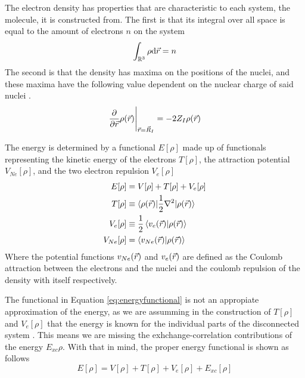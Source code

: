\documentclass[../master_thesis.tex]{subfiles}
\begin{document}
The electron density has properties that are characteristic to each system, the
molecule,  it is constructed from. The first is that its integral over all space
is equal to the amount of electrons $n$ on the system \cite{Cramer:2004}
\begin{equation}
  \int_{\mathbb{R}^3}\rho \text{d}\vec{r} = n
\end{equation}
The second is that the density has maxima on the positions of the nuclei, and
these maxima have the following value dependent on the nuclear charge of said
nuclei \cite{Cramer:2004}.
\begin{equation}
 \frac{\partial}{\partial \vec{r}}\rho(\vec{r})\Bigg|_{\vec{r} = \vec{R}_I} = -2Z_I\rho(\vec{r})
\end{equation}

The energy is determined by a functional $E[\rho]$ made up of functionals representing
the kinetic energy of the electrons $T[\rho]$, the attraction potential $V_{Ne}[\rho]$,
and the two electron repulsion $V_{e}[\rho]$ \cite{Sorland, PhysRev.136.B864}
\begin{align}
  E[\rho] &= V[\rho] + T[\rho] + V_{e}[\rho]\\\label{eq:energyfunctional}
  T[\rho] &\equiv\braket{\rho(\vec{r})| \frac{1}{2}\nabla^2| \rho(\vec{r})} \\
  V_{e}[\rho] &\equiv \frac{1}{2}\braket{v_{e}(\vec{r})| \rho(\vec{r})}\\
  V_{Ne}[\rho] &= \braket{v_{Ne}(\vec{r})|\rho(\vec{r})}
\end{align}
Where the potential functions $v_{Ne}(\vec{r})$  and $v_{e}(\vec{r})$ are defined as the Coulomb
attraction between the electrons and the nuclei and the coulomb repulsion of the
density with itself \cite{Sorland} respectively.

The functional in Equation \ref{eq:energyfunctional} is not an appropiate approximation
of the energy, as we are assumming in the construction of $T[\rho]$ and $V_{e}[\rho]$
that the energy is known for the individual parts of the disconnected system \cite{Sorland}.
This means we are missing the exhchange-correlation contributions of the energy $E_{xc}{\rho}$.
With that in mind, the proper energy functional is shown as follows
\begin{equation}\label{eq:adjustedenergyfunc}
  E[\rho] = V[\rho] + T[\rho] + V_{e}[\rho] + E_{xc}[\rho]
\end{equation}
\end{document}

